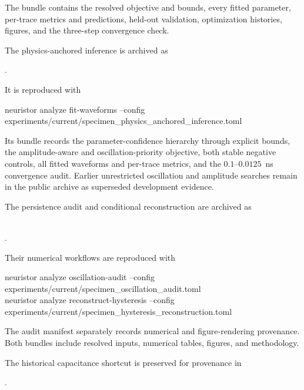 \documentclass[11pt]{article}
\begin{document}
The bundle contains the resolved objective and bounds, every fitted parameter,
per-trace metrics and predictions, held-out validation, optimization histories,
figures, and the three-step convergence check.

The physics-anchored inference is archived as

\begin{center}
\footnotesize
{}.
\end{center}

It is reproduced with

\begin{center}
\ttfamily\small
neuristor analyze fit-waveforms --config experiments/current/specimen\_physics\_anchored\_inference.toml
\end{center}

Its bundle records the parameter-confidence hierarchy through explicit bounds, the
amplitude-aware and oscillation-priority objective, both stable negative controls,
all fitted waveforms and per-trace metrics, and the $0.1$--$0.0125$~ns convergence
audit. Earlier unrestricted oscillation and amplitude searches remain in the public
archive as superseded development evidence.

The persistence audit and conditional reconstruction are archived as
\begin{center}
\footnotesize
{}\\
.
\end{center}
Their numerical workflows are reproduced with
\begin{center}
\ttfamily\small
neuristor analyze oscillation-audit --config\\
experiments/current/specimen\_oscillation\_audit.toml\\[4pt]
neuristor analyze reconstruct-hysteresis --config\\
experiments/current/specimen\_hysteresis\_reconstruction.toml
\end{center}
The audit manifest separately records numerical and figure-rendering provenance.
Both bundles include resolved inputs, numerical tables, figures, and methodology.

The historical capacitance shortcut is preserved for provenance in

\begin{center}
\footnotesize
{}.
\end{center}
\end{document}
